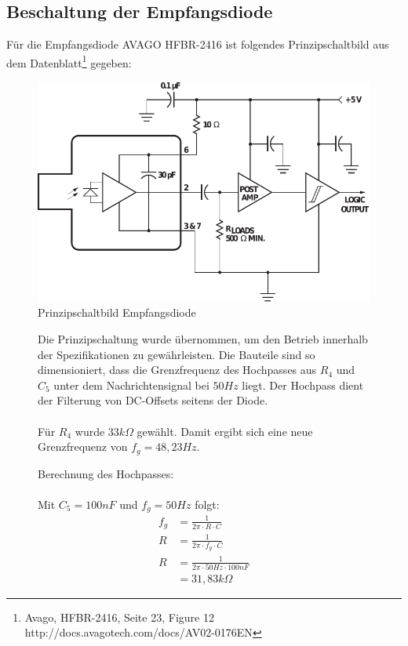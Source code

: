 \subsection{Beschaltung der Empfangsdiode}
\label{subsec:receiver_schematic}
Für die Empfangsdiode \textsc{AVAGO HFBR-2416} ist folgendes Prinzipschaltbild aus dem Datenblatt\footnote{Avago, HFBR-2416, Seite 23, Figure 12 http://docs.avagotech.com/docs/AV02-0176EN} gegeben:
\begin{figure}[H]
	\centering
	\includegraphics[scale=0.65]{gfx/hfbr.pdf}
	\caption{Prinzipschaltbild Empfangsdiode}
	\label{fig:basic_schematic} 
\end{figure}
\begin{figure}[H]
	\begin{minipage}{0.45\textwidth} 
		Die Prinzipschaltung wurde übernommen, um den Betrieb innerhalb der Spezifikationen zu gewährleisten. Die Bauteile sind so dimensioniert, dass die Grenzfrequenz des Hochpasses aus $R_4$ und $C_5$ unter dem Nachrichtensignal bei $50Hz$ liegt. Der Hochpass dient der Filterung von DC-Offsets seitens der Diode. \\ \\
	Für $R_4$ wurde $33k\Omega$ gewählt. Damit ergibt sich eine neue Grenzfrequenz von $ f_{g}=48,23Hz $.
	\end{minipage}
	\hfill
	\begin{minipage}{0.45\textwidth}
	Berechnung des Hochpasses: \\ \\
	Mit $C_5 = 100nF$ und $f_g=50Hz$  folgt:
	\savebox\strutbox{$\vphantom{\dfrac11}$}
	\begin{align}
	  f_g &= \frac{1}{2 \pi \cdot R \cdot C}\\
		R &= \frac{1}{2 \pi \cdot f_g \cdot C}\\
		R &= \frac{1}{2 \pi \cdot 50 Hz \cdot 100nF}\\
		  &= 31,83k\Omega		 	
	\end{align}  
	\end{minipage}
\end{figure}
